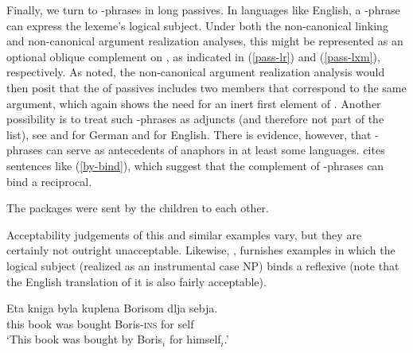 \documentclass[output=paper
                ,modfonts
                ,nonflat
	        ,collection
	        ,collectionchapter
	        ,collectiontoclongg
 	        ,biblatex
                ,babelshorthands
                ,newtxmath
                ,draftmode
                ,colorlinks, citecolor=brown
]{./langsci/langscibook}
\begin{document}

Finally, we turn to -phrases in long passives.
In languages like English, a -phrase can express the lexeme's logical subject.
Under both the non-canonical linking and non-canonical argument realization analyses, this might be represented as an optional oblique complement on \argst, as indicated in (\ref{pass-lr}) and (\ref{pass-lxm}), respectively.
As noted, the non-canonical argument realization analysis would then posit that the \argst of passives includes two members that correspond to the same argument, which again shows the need for an inert first element of \argst.
Another possibility is to treat such -phrases as adjuncts (and therefore not part of the \argst list), see \citet[Chapter 7]{Hoehle78a} and \citet[292--294]{Mueller2003e} for German and \citet[180]{Jackendoff1990} for English. 
There is evidence, however, that -phrases can serve as antecedents of anaphors in at least some languages.
\citet[111]{Collins2005} cites sentences like (\ref{by-bind}), which suggest that the complement of -phrases can bind a reciprocal.

\begin{exe}
\ex\label{by-bind}The packages were sent by the children to each other.
\end{exe} 

Acceptability judgements of this and similar examples vary, but they are certainly not outright unacceptable.  Likewise, \citet[10]{Perlmutter1984}, furnishes  examples in which the logical subject (realized as an instrumental case NP) binds a reflexive (note that the English translation of it is also fairly acceptable).

\begin{exe}
\ex     \label{russian-pass}
             \gll Eta kniga byla kuplena Borisom dlja sebja.  \\
             this book was bought Boris-\textsc{ins} for self  \\
             \glt `This book was bought by Boris$_{i}$ for himself$_{i}$.'
\end{exe}
\end{document}
